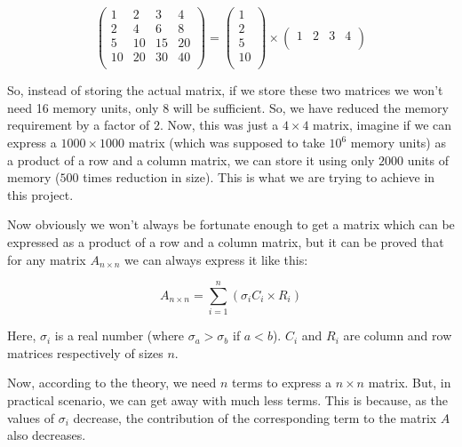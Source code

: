 		$$
		\left(
		\begin{matrix}
			1 & 2 & 3 & 4\\
			2 & 4 & 6 & 8\\
			5 & 10 & 15 & 20\\
			10 & 20 & 30 & 40\\
		\end{matrix}
		\right)=
		\left(
			\begin{matrix}
				1\\
				2\\
				5\\
				10\\
			\end{matrix}
		\right)\times
		\left(
			\begin{matrix}
				1 & 2 & 3 & 4\\
			\end{matrix}
		\right)
		$$

		So, instead of storing the actual matrix, if we store these two matrices we won't need 16 memory units, only $8$ will be sufficient. So, we have reduced the memory requirement by a factor of $2$. Now, this was just a $4\times4$ matrix, imagine if we can express a $1000\times1000$ matrix (which was supposed to take $10^6$ memory units) as a product of a row and a column matrix, we can store it using only $2000$ units of memory ($500$ times reduction in size). This is what we are trying to achieve in this project.

		Now obviously we won't always be fortunate enough to get a matrix which can be expressed as a product of a row and a column matrix, but it can be proved that for any matrix $A_{n\times n}$ we can always express it like this:

		$$A_{n\times n} = \sum_{i=1}^n (\sigma_iC_i\times R_i)$$

		Here, $\sigma_i$ is a real number (where $\sigma_a>\sigma_b$ if $a<b$). $C_i$ and $R_i$ are column and row matrices respectively of sizes $n$.

		Now, according to the theory, we need $n$ terms to express a $n\times n$ matrix. But, in practical scenario, we can get away with much less terms. This is because, as the values of $\sigma_i$ decrease, the contribution of the corresponding term to the matrix $A$ also decreases.



